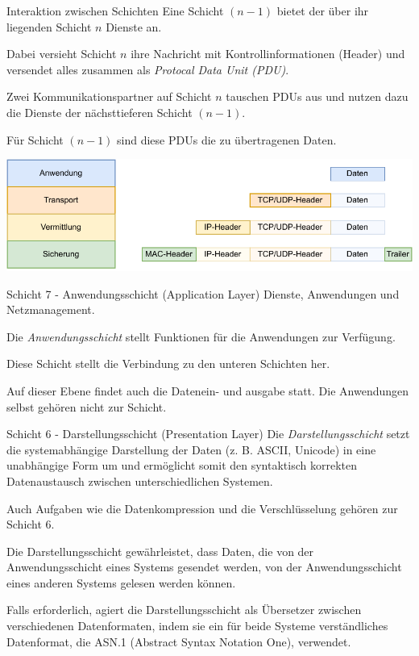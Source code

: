 \begin{defi}{Interaktion zwischen Schichten}
    Eine Schicht $(n-1)$ bietet der über ihr liegenden Schicht $n$ Dienste an.

    Dabei versieht Schicht $n$ ihre Nachricht mit Kontrollinformationen (Header) und versendet alles zusammen als \emph{Protocal Data Unit (PDU)}.

    Zwei Kommunikationspartner auf Schicht $n$ tauschen PDUs aus und nutzen dazu die Dienste der nächsttieferen Schicht $(n-1)$.

    Für Schicht $(n-1)$ sind diese PDUs die zu übertragenen Daten.

    \centering
    \includegraphics[width=\textwidth]{includes/figures/defi_header_kapselung.pdf}
\end{defi}

\begin{defi}{Schicht 7 - Anwendungsschicht (Application Layer)}
    Dienste, Anwendungen und Netzmanagement.

    Die \emph{Anwendungsschicht} stellt Funktionen für die Anwendungen zur Verfügung.

    Diese Schicht stellt die Verbindung zu den unteren Schichten her.

    Auf dieser Ebene findet auch die Datenein- und ausgabe statt.
    Die Anwendungen selbst gehören nicht zur Schicht.
\end{defi}

\begin{defi}{Schicht 6 - Darstellungsschicht (Presentation Layer)}
    Die \emph{Darstellungsschicht} setzt die systemabhängige Darstellung der Daten (z. B. ASCII, Unicode) in eine unabhängige Form um und ermöglicht somit den syntaktisch korrekten Datenaustausch zwischen unterschiedlichen Systemen.

    Auch Aufgaben wie die Datenkompression und die Verschlüsselung gehören zur Schicht 6.

    Die Darstellungsschicht gewährleistet, dass Daten, die von der Anwendungsschicht eines Systems gesendet werden, von der Anwendungsschicht eines anderen Systems gelesen werden können.

    Falls erforderlich, agiert die Darstellungsschicht als Übersetzer zwischen verschiedenen Datenformaten, indem sie ein für beide Systeme verständliches Datenformat, die ASN.1 (Abstract Syntax Notation One), verwendet.
\end{defi}

